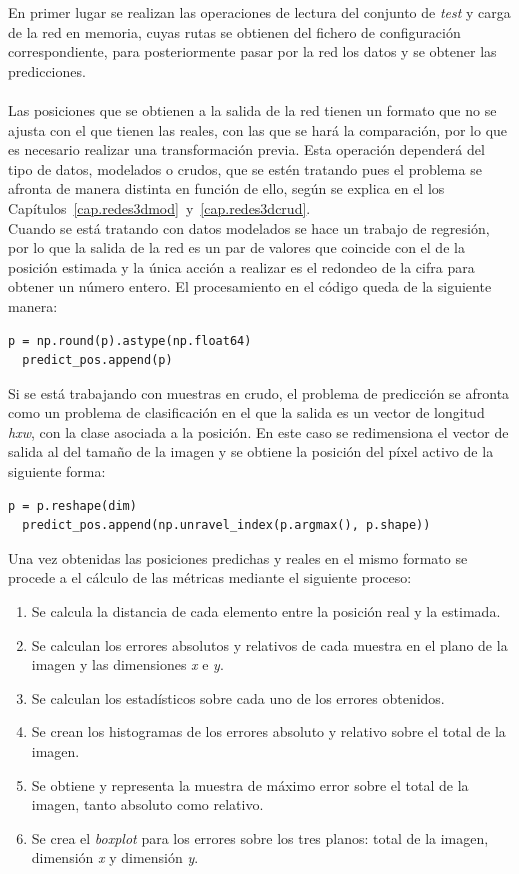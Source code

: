 En primer lugar se realizan las operaciones de lectura del conjunto de \textit{test} y carga de la red en memoria, cuyas rutas se obtienen del fichero de configuración correspondiente, para posteriormente pasar por la red los datos y se obtener las predicciones.\\
\vspace{20pt}
\\
Las posiciones que se obtienen a la salida de la red tienen un formato que no se ajusta con el que tienen las reales, con las que se hará la comparación, por lo que es necesario realizar una transformación previa. Esta operación dependerá del tipo de datos, modelados o crudos, que se estén tratando pues el problema se afronta de manera distinta en función de ello, según se explica en el los Capítulos~\ref{cap.redes3dmod}~y~\ref{cap.redes3dcrud}.\\
Cuando se está tratando con datos modelados se hace un trabajo de regresión, por lo que la salida de la red es un par de valores que coincide con el de la posición estimada y la única acción a realizar es el redondeo de la cifra para obtener un número entero. El procesamiento en el código queda de la siguiente manera:
\vspace{10pt}
\begin{lstlisting}[frame=single]
  p = np.round(p).astype(np.float64)
  predict_pos.append(p)
\end{lstlisting}
Si se está trabajando con muestras en crudo, el problema de predicción se afronta como un problema de clasificación en el que la salida es un vector de longitud \textit{hxw}, con la clase asociada a la posición. En este caso se redimensiona el vector de salida al del tamaño de la imagen y se obtiene la posición del píxel activo de la siguiente forma:
\vspace{10pt}
\begin{lstlisting}[frame=single]
  p = p.reshape(dim)
  predict_pos.append(np.unravel_index(p.argmax(), p.shape))
\end{lstlisting}

Una vez obtenidas las posiciones predichas y reales en el mismo formato se procede a el cálculo de las métricas mediante el siguiente proceso:

\begin{enumerate}
    \item Se calcula la distancia de cada elemento entre la posición real y la estimada.
    \item Se calculan los errores absolutos y relativos de cada muestra en el plano de la imagen y las dimensiones \textit{x} e \textit{y}.
    \item Se calculan los estadísticos sobre cada uno de los errores obtenidos.
    \item Se crean los histogramas de los errores absoluto y relativo sobre el total de la imagen.
    \item Se obtiene y representa la muestra de máximo error sobre el total de la imagen, tanto absoluto como relativo.
    \item Se crea el \textit{boxplot} para los errores sobre los tres planos: total de la imagen, dimensión \textit{x} y dimensión \textit{y}.
\end{enumerate}

